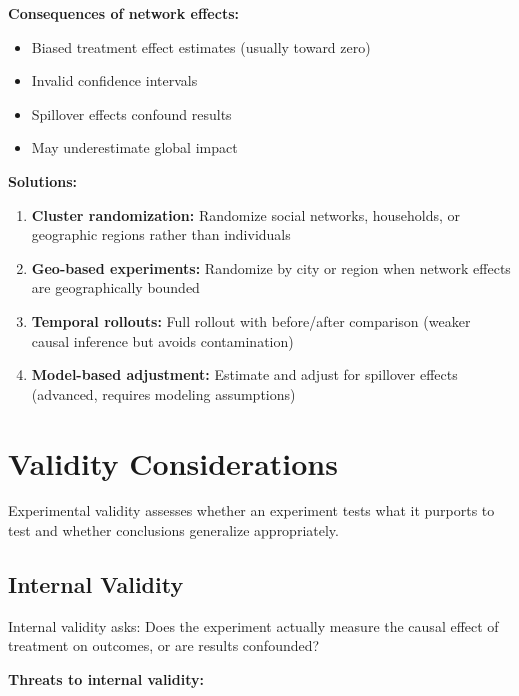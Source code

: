 \textbf{Consequences of network effects:}

\begin{itemize}
    \item Biased treatment effect estimates (usually toward zero)
    \item Invalid confidence intervals
    \item Spillover effects confound results
    \item May underestimate global impact
\end{itemize}

\textbf{Solutions:}

\begin{enumerate}
    \item \textbf{Cluster randomization:} Randomize social networks, households, or geographic regions rather than individuals

    \item \textbf{Geo-based experiments:} Randomize by city or region when network effects are geographically bounded

    \item \textbf{Temporal rollouts:} Full rollout with before/after comparison (weaker causal inference but avoids contamination)

    \item \textbf{Model-based adjustment:} Estimate and adjust for spillover effects (advanced, requires modeling assumptions)
\end{enumerate}

\section{Validity Considerations}

Experimental validity assesses whether an experiment tests what it purports to test and whether conclusions generalize appropriately.

\subsection{Internal Validity}

Internal validity asks: Does the experiment actually measure the causal effect of treatment on outcomes, or are results confounded?

\textbf{Threats to internal validity:}

